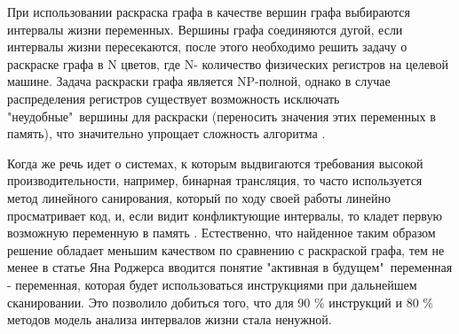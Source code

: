 
При использовании раскраска графа в качестве вершин графа выбираются интервалы жизни переменных. Вершины графа соединяются дугой, если интервалы жизни пересекаются, после этого необходимо решить задачу о раскраске графа в N цветов, где N- количество физических регистров на целевой машине. Задача раскраски графа является NP-полной, однако в случае распределения регистров существует возможность исключать "неудобные"\  вершины для раскраски (переносить значения этих переменных в память), что значительно упрощает сложность алгоритма \cite{smith2004generalized, briggs1992register}. 

Когда же речь идет о системах, к которым выдвигаются требования высокой производительности, например, бинарная трансляция, то часто используется метод линейного санирования, который по ходу своей работы линейно просматривает код, и, если видит конфликтующие интервалы, то кладет первую возможную переменную в память \cite{poletto1999linear}. Естественно, что найденное таким образом решение обладает меньшим качеством по сравнению с раскраской графа, тем не менее в статье Яна Роджерса \cite{rogers2020efficient} вводится понятие "активная в будущем"\ переменная - переменная, которая будет использоваться инструкциями при дальнейшем сканировании. Это позволило добиться того, что для 90 \% инструкций и 80 \% методов модель анализа интервалов жизни стала ненужной. 


